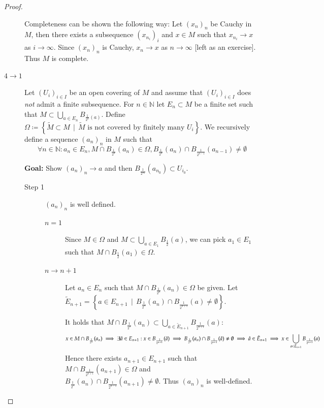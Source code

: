 \documentclass[a4paper]{article}
\numberwithin{lecref}{section}
\newcommand{\SetDef}[2]{\left\{#1\,\mid\,#2\right\}}
\begin{document}
\begin{proof}
\begin{description}
			Completeness can be shown the following way:
			Let $(x_n)_n$ be Cauchy in $M$, then there exists a subsequence $(x_{n_i})_i$ and $x \in M$ such that $x_{n_i} \to x$ as $i \to \infty$.
			Since $(x_n)_n$ is Cauchy, $x_n \to x$ as $n \to \infty$ [left as an exercise]. Thus $M$ is complete.
		\item[$4 \to 1$]
			Let $(U_i)_{i \in I}$ be an open covering of $M$ and assume that $(U_i)_{i \in I}$ does \emph{not} admit a finite subsequence.
			For $n \in \mathbb N$ let $E_n \subset M$ be a finite set such that $M \subset \bigcup_{a \in E_n} B_{\frac1{2^n}(a)}$.
			Define $\Omega \coloneqq \SetDef{\tilde M \subset M}{\tilde M \text{ is not covered by finitely many } U_i}$.
			We recursively define a sequence $(a_n)_n$ in $M$ such that
			\[ \forall n \in \mathbb N: a_n \in E_n, M \cap B_{\frac1{2^n}}(a_n) \in \Omega, B_{\frac{1}{2^n}}(a_n) \cap B_{\frac{1}{2^{n-1}}}(a_{n-1}) \neq \emptyset \]

			\textbf{Goal:} Show $(a_n)_n \to a$ and then $B_{\frac{1}{2^{n_0}}}(a_{n_0}) \subset U_{i_0}$.

			\begin{description}
				\item[Step 1]
					$(a_n)_n$ is well defined.
					\begin{description}
						\item[$n=1$] Since $M \in \Omega$ and $M \subset \bigcup_{a \in E_1} B_{\frac12}(a)$, we can pick $a_1 \in E_1$ such that $M \cap B_{\frac12}(a_1) \in \Omega$.
						\item[$n \to n+1$]
							Let $a_n \in E_n$ such that $M \cap B_{\frac1{2^n}}(a_n) \in \Omega$ be given.
							Let $\tilde E_{n+1} = \SetDef{a \in E_{n+1}}{B_{\frac1{2^n}}(a_n) \cap B_{\frac1{2^{n+1}}}(a) \neq \emptyset}$.

						It holds that $M \cap B_{\frac1{2^n}}(a_n) \subset \bigcup_{a \in \tilde E_{n+1}} B_{\frac{1}{2^{n+1}}}(a)$:
            \[
              x \in M \cap B_{\frac1{2^n}}(a_n) \implies \exists \hat a \in E_{n + 1} : x \in B_{\frac{1}{2^{n + 1}}}(\hat a) \\
              \implies B_{\frac1{2^n}}(a_n) \cap B_{\frac{1}{2^{n + 1}}}(\hat a) \neq \emptyset \implies \hat a \in \tilde E_{n + 1} \implies x \in \bigcup_{a \in \tilde E_{n + 1}} B_{\frac1{2^{n + 1}}}(a)
            \]
						Hence there exists $a_{n+1} \in E_{n + 1}$ such that $M \cap B_{\frac{1}{2^{n+1}}}(a_{n+1}) \in \Omega$ and \\ $B_{\frac{1}{2^n}}(a_n) \cap B_{\frac{1}{2^{n-1}}}(a_{n+1}) \neq \emptyset$.
						Thus $(a_n)_n$ is well-defined.
					\end{description}


\end{description}
\end{description}
\end{proof}
\end{document}
